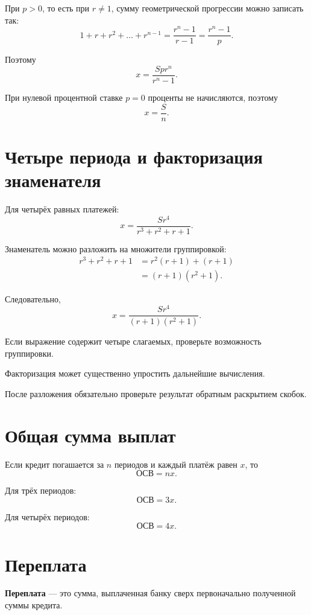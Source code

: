 \documentclass[a4paper,12pt]{article}
\newcommand{\term}[1]{\textbf{\color{darkaccent}#1}}
\begin{document}
При \(p>0\), то есть при \(r\ne 1\), сумму геометрической прогрессии можно
записать так:
\[
1+r+r^2+\dots+r^{n-1}
=
\frac{r^n-1}{r-1}
=
\frac{r^n-1}{p}.
\]

Поэтому
\[
\boxed{
x=\frac{Spr^n}{r^n-1}
}.
\]

При нулевой процентной ставке \(p=0\) проценты не начисляются, поэтому
\[
\boxed{x=\frac{S}{n}}.
\]

\section{Четыре периода и факторизация знаменателя}

Для четырёх равных платежей:
\[
\boxed{
x=\frac{Sr^4}{r^3+r^2+r+1}
}.
\]

Знаменатель можно разложить на множители группировкой:
\begin{align*}
r^3+r^2+r+1
  &=r^2(r+1)+(r+1)\\
  &=(r+1)(r^2+1).
\end{align*}

Следовательно,
\[
\boxed{
x=\frac{Sr^4}{(r+1)(r^2+1)}
}.
\]

\begin{checklist}
  \item Если выражение содержит четыре слагаемых, проверьте возможность
  группировки.

  \item Факторизация может существенно упростить дальнейшие вычисления.

  \item После разложения обязательно проверьте результат обратным раскрытием
  скобок.
\end{checklist}

\section{Общая сумма выплат}

Если кредит погашается за \(n\) периодов и каждый платёж равен \(x\), то
\[
\boxed{\text{ОСВ}=nx}.
\]

Для трёх периодов:
\[
\boxed{\text{ОСВ}=3x}.
\]

Для четырёх периодов:
\[
\boxed{\text{ОСВ}=4x}.
\]

\section{Переплата}

\term{Переплата} --- это сумма, выплаченная банку сверх первоначально
полученной суммы кредита.
\end{document}
